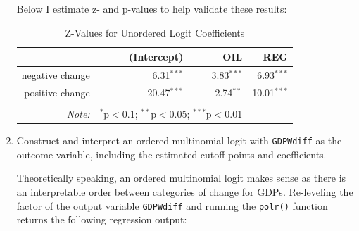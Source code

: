 \documentclass[12pt,letterpaper]{article}
\begin{document}
\begin{enumerate}
	
	Below I estimate z- and p-values to help validate these results:\\
	
	\begin{table}[ht]
		\centering
		\caption{Z-Values for Unordered Logit Coefficients}
		\begin{tabular}{rrrr}
			\hline
			& (Intercept) & OIL & REG \\ 
			\hline
			negative change & 6.31$^{***}$ & 3.83$^{***}$ & 6.93$^{***}$ \\ 
			positive change & 20.47$^{***}$ & 2.74$^{**}$ & 10.01$^{***}$ \\ 
			\hline \\[-1.8ex]
			\textit{Note:}  & \multicolumn{2}{r}{$^{*}$p$<$0.1; $^{**}$p$<$0.05; $^{***}$p$<$0.01} \\ 
		\end{tabular}
	\end{table}
	
			
	
	\item Construct and interpret an ordered multinomial logit with \texttt{GDPWdiff} as the outcome variable, including the estimated cutoff points and coefficients.
	
	Theoretically speaking, an ordered multinomial logit makes sense as there is an interpretable order between categories of change for GDPs. Re-leveling the factor of the output variable \texttt{GDPWdiff} and running the \texttt{polr()} function returns the following regression output:\\
	
				
				

\end{enumerate}
\end{document}
